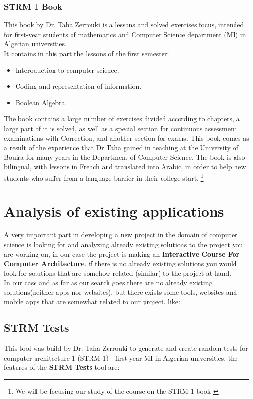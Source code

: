 \subsubsection{STRM 1 Book }
This book by Dr. Taha Zerrouki is a lessons and solved exercises focus, intended for first-year students of mathematics and Computer Science department (MI) in 
Algerian universities.\cite{STRM-1-Book-Taha-Zerrouki}\\
It contains in this part the lessons of the first semester:
\begin{itemize}
	\item Interoduction to computer science.
	\item Coding and representation of information.
	\item Boolean Algebra.
\end{itemize}
The book contains a large number of exercises divided according to chapters, a large part of it is solved, as well as a special section for continuous assessment examinations with
Correction, and another section for exams.
This book comes as a result of the experience that Dr Taha gained in teaching at the University of Bouira for many years in the Department of Computer Science.
The book is also bilingual, with lessons in French and translated into Arabic, in order to help new students who suffer from a language barrier in their college start.
\footnote{We will be focusing our study of the course on the STRM 1 book \cite{STRM-1-Book-Taha-Zerrouki}}



 \section{Analysis of existing applications}
 A very important part in developing a new project in the domain of computer science is looking for and analyzing already
  existing solutions to the project you are working on, in our case the project is making an \textbf{Interactive Course For Computer Architecture}.
  if there is no already existing solutions you would look for solutions that are somehow related (similar) to the project at hand.\\
  In our case and as far as our search goes there are no already existing solutions(neither apps nor websites), but there exists some tools, websites and mobile apps that are somewhat related to our project. like:


 \subsection{STRM Tests }
 This tool was build by  Dr. Taha Zerrouki to generate and create random tests for computer architecture 1 (STRM 1) - first year MI in Algerian universities.\cite{STRM-Tests}
 the features of the \textbf{STRM Tests} tool\cite{STRM-Tests} are:


